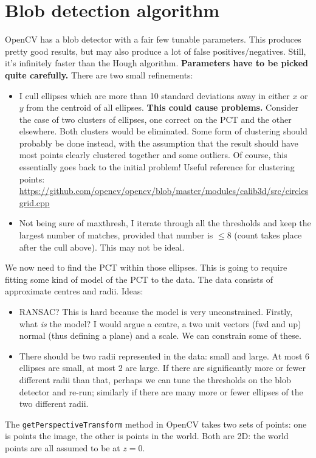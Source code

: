 \section{Blob detection algorithm}
OpenCV has a blob detector with a fair few tunable parameters. This produces pretty good results,
but may also produce a lot of false positives/negatives. Still, it's infinitely faster than the
Hough algorithm. \textbf{Parameters have to be picked quite carefully.} There are two small refinements:
\begin{itemize}
\item I cull ellipses which are more than 10 standard deviations away in either $x$ or $y$ from
the centroid of all ellipses. \textbf{This could cause problems.} Consider
the case of two clusters of ellipses, one correct on the PCT and the other
elsewhere. Both clusters would be eliminated. Some form of clustering
should probably be done instead, with the assumption that the result
should have most points clearly clustered together and some outliers. Of
course, this essentially goes back to the initial problem!
Useful reference for clustering points: \url{https://github.com/opencv/opencv/blob/master/modules/calib3d/src/circlesgrid.cpp}
\item Not being sure of maxthresh, I iterate through all the thresholds and keep the largest number of
matches, provided that number is $\le 8$ (count takes place after the cull above). This may not be ideal.
\end{itemize}


We now need to find the PCT within those ellipses. This is going to require fitting some kind of
model of the PCT to the data. The data consists of approximate centres and radii. 
Ideas:
\begin{itemize}
\item RANSAC? This is hard because the model is very unconstrained. Firstly, what \emph{is} the
model? I would argue a centre, a two unit vectors (fwd and up) normal (thus defining a plane) and a scale.
We can constrain some of these.
\item There should be two radii represented in the data: small and large. At most 6 ellipses are small, at most
2 are large. If there are significantly more or fewer different radii than that, perhaps we can tune the thresholds on the blob
detector and re-run; similarly if there are many more or fewer ellipses of the two different radii.
\end{itemize}
The \verb+getPerspectiveTransform+ method in OpenCV takes two sets of 
points: one is points the image, the other is points in the world. Both are 2D: the world points
are all assumed to be at $z=0$. 

